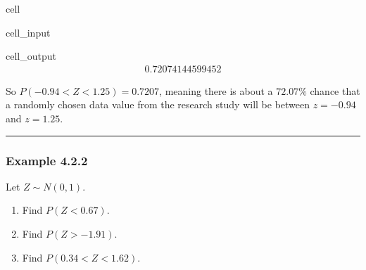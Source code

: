 \documentclass[letterpaper,10pt,english]{jupyterBook}
\begin{document}
\begin{sphinxuseclass}{cell}\begin{sphinxVerbatimInput}

\begin{sphinxuseclass}{cell_input}
\begin{sphinxVerbatim}[commandchars=\\\{\}]
\end{sphinxVerbatim}

\end{sphinxuseclass}\end{sphinxVerbatimInput}
\begin{sphinxVerbatimOutput}

\begin{sphinxuseclass}{cell_output}\begin{equation*}
\begin{split}0.72074144599452\end{split}
\end{equation*}
\end{sphinxuseclass}\end{sphinxVerbatimOutput}

\end{sphinxuseclass}
\sphinxAtStartPar
So \(P(-0.94 < Z < 1.25) = 0.7207\), meaning there is about a \(72.07\%\) chance that a randomly chosen data value from the research study will be between \(z = -0.94\) and \(z = 1.25\).


\bigskip\hrule\bigskip



\subsubsection{Example 4.2.2}
\label{\detokenize{Ch4 The Normal Distribution and the Central Limit Theorem/4.2 The Standard Normal Distribution:example-4-2-2}}
\sphinxAtStartPar
Let \(Z\sim N(0, 1)\).
\begin{enumerate}
%
\item {} 
\sphinxAtStartPar
Find \(P(Z < 0.67)\).

\item {} 
\sphinxAtStartPar
Find \(P(Z > -1.91)\).

\item {} 
\sphinxAtStartPar
Find \(P(0.34 < Z < 1.62)\).

\end{enumerate}
\end{document}
